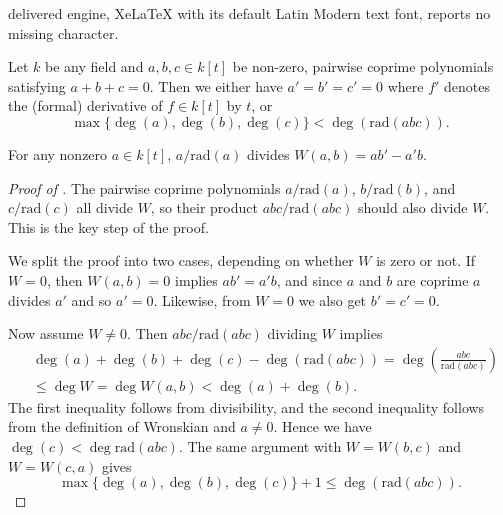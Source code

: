 \documentclass[10pt,a4paper]{amsart}
\newcommand{\rad}{\mathrm{rad}}
\begin{document}
delivered engine, XeLaTeX with its default Latin Modern text font, reports no missing character.
\begin{theorem}
\label{thm:Mason--Stothers}
Let $k$ be any field and $a, b, c \in k[t]$ be non-zero, pairwise coprime polynomials satisfying $a + b + c = 0$.
Then we either have $a' = b' = c' = 0$ where $f'$ denotes the (formal) derivative of $f \in k[t]$ by $t$, or
\[
\max\{\deg(a), \deg(b), \deg(c)\} < \deg (\rad(abc)).
\]
\end{theorem}

\begin{lemma}
For any nonzero $a \in k[t]$, $a /\rad(a)$ divides $W(a, b) = ab' - a'b$.
\end{lemma}

\begin{proof}[Proof of ]
The pairwise coprime polynomials $a / \rad(a)$, $b / \rad(b)$, and $c / \rad(c)$ all divide $W$, so their product $abc / \rad(abc)$ should also divide $W$. This is the key step of the proof.

We split the proof into two cases, depending on whether $W$ is zero or not.
If $W = 0$, then $W(a, b) = 0$ implies $a b' = a' b$, and since $a$ and $b$ are coprime $a$ divides $a'$ and so $a' = 0$. Likewise, from $W = 0$ we also get $b' = c' = 0$.

Now assume $W \neq 0$. Then $abc / \rad(abc)$ dividing $W$ implies
\begin{align*}
    &\deg(a) + \deg(b) + \deg(c) - \deg(\rad(abc)) = \deg \left(\frac{abc}{\rad(abc)}\right) \\
    &\le \deg W = \deg W(a, b) < \deg(a) + \deg(b).
\end{align*}
The first inequality follows from divisibility, and the second inequality follows from the definition of Wronskian and $a \neq 0$.
Hence we have $\deg(c) < \deg \rad(abc)$. The same argument with $W = W(b, c)$ and $W = W(c, a)$ gives
\[
\max\{\deg(a), \deg(b), \deg(c)\} + 1\le \deg(\rad(abc)).
\]
\end{proof}
\end{document}
